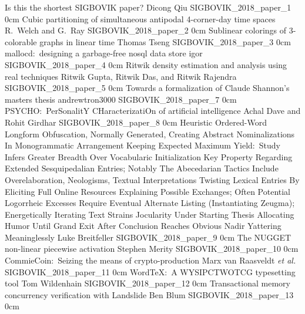 \addpaper
	{Is this the shortest SIGBOVIK paper?}
	{Dicong Qiu}
	{}
	{SIGBOVIK_2018_paper_1}
	{0cm}
	{}
\addpaper
	{Cubic partitioning of simultaneous antipodal 4-corner-day time spaces}
	{R.\ Welch and G.\ Ray}
	{}
	{SIGBOVIK_2018_paper_2}
	{0cm}
	{}
\addpaper
	{Sublinear colorings of 3-colorable graphs in linear time}
	{Thomas Tseng}
	{}
	{SIGBOVIK_2018_paper_3}
	{0cm}
	{}
\addpaper
	{mallocd:\ designing a garbage-free nosql data store}
	{igor}
	{}
	{SIGBOVIK_2018_paper_4}
	{0cm}
	{}
\addpaper
	{Ritwik density estimation and analysis using real techniques}
	{Ritwik Gupta, Ritwik Das, and Ritwik Rajendra}
	{}
	{SIGBOVIK_2018_paper_5}
	{0cm}
	{}
\addpaper
	{Towards a formalization of Claude Shannon's masters thesis}
	{andrewtron3000}
	{}
	{SIGBOVIK_2018_paper_7}
	{0cm}
	{}
\addpaper
	{PSYCHO:\ PerSonalitY CHaracterizatiOn of artificial intelligence}
	{Achal Dave and Rohit Girdhar}
	{}
	{SIGBOVIK_2018_paper_8}
	{0cm}
	{}
\addpaper
	{Heuristic Ordered-Word Longform Obfuscation, Normally Generated, Creating Abstract
	Nominalizations In Monogrammatic Arrangement Keeping Expected Maximum Yield:\ Study Infers
	Greater Breadth Over Vocabularic Initialization Key Property Regarding Extended
	Sesquipedalian Entries; Notably The Abecedarian Tactics Include Overelaboration, Neologisms,
	Textual Interpretations Twisting Lexical Entries By Eliciting Full Online Resources
	Explaining Possible Exchanges; Often Potential Logorrheic Excesses Require Eventual
	Alternate Listing (Instantiating Zeugma); Energetically Iterating Text Strains Jocularity
	Under Starting Thesis Allocating Humor Until Grand Exit After Conclusion Reaches Obvious
	Nadir Yattering Meaninglessly}
	{Luke Breitfeller}
	{}
	{SIGBOVIK_2018_paper_9}
	{0cm}
	{}
\addpaper
	{The NUGGET non-linear piecewise activation}
	{Stephen Merity}
	{}
	{SIGBOVIK_2018_paper_10}
	{0cm}
	{}
\addpaper
	{CommieCoin:\ Seizing the means of crypto-production}
	{Marx van Raasveldt \textit{et al.}}
	{}
	{SIGBOVIK_2018_paper_11}
	{0cm}
	{}
\addpaper
	{WordTeX:\ A WYSIPCTWOTCG typesetting tool}
	{Tom Wildenhain}
	{}
	{SIGBOVIK_2018_paper_12}
	{0cm}
	{}
\addpaper
	{Transactional memory concurrency verification with Landslide}
	{Ben Blum}
	{}
	{SIGBOVIK_2018_paper_13}
	{0cm}
	{}


